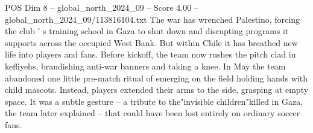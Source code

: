 \begin{textsample}{POS Dim 8 – global\_north\_2024\_09 – Score 4.00 – global\_north\_2024\_09/113816104.txt}
The war has wrenched Palestino, forcing the club ' s training school in Gaza to shut down and disrupting programs it supports across the occupied West Bank.
But within Chile it has breathed new life into players and fans.
Before kickoff, the team now rushes the pitch clad in keffiyehs, brandishing anti-war banners and taking a knee.
In May the team abandoned one little pre-match ritual of emerging on the field holding hands with child mascots.
Instead, players extended their arms to the side, grasping at empty space.
It was a subtle gesture -- a tribute to the"invisible children"killed in Gaza, the team later explained -- that could have been lost entirely on ordinary soccer fans.

\end{textsample}
